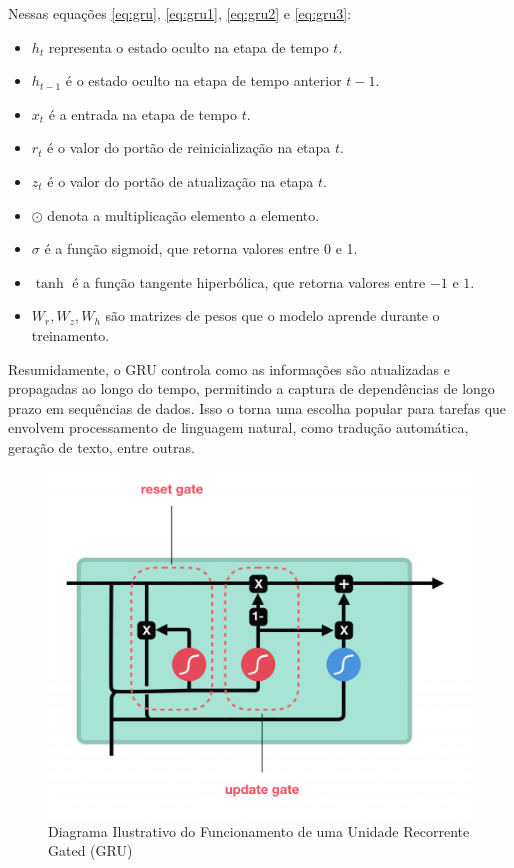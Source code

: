 Nessas equações \eqref{eq:gru}, \eqref{eq:gru1}, \eqref{eq:gru2} e \eqref{eq:gru3}:

\begin{itemize}
	\item \( h_t \) representa o estado oculto na etapa de tempo \( t \).

	\item \( h_{t-1} \) é o estado oculto na etapa de tempo anterior \( t-1 \).

	\item \( x_t \) é a entrada na etapa de tempo \( t \).

	\item \( r_t \) é o valor do portão de reinicialização na etapa \( t \).

	\item \( z_t \) é o valor do portão de atualização na etapa \( t \).

	\item \( \odot \) denota a multiplicação elemento a elemento.

	\item \( \sigma \) é a função sigmoid, que retorna valores entre 0 e 1.

	\item \( \tanh \) é a função tangente hiperbólica, que retorna valores entre $-1$ e $1$.

	\item \( W_r, W_z, W_h \) são matrizes de pesos que o modelo aprende durante o treinamento.
\end{itemize}

Resumidamente, o GRU controla como as informações são atualizadas e propagadas ao longo do tempo, permitindo a captura de dependências de longo prazo em sequências de dados. Isso o torna uma escolha popular para tarefas que envolvem processamento de linguagem natural, como tradução automática, geração de texto, entre outras.

\begin{figure}[!htpb]
	\centering
	\caption{Diagrama Ilustrativo do Funcionamento de uma Unidade Recorrente Gated (GRU)}
	\label{fig:gru4-1024x835}
	\includegraphics[width=0.7\linewidth]{Apendices/Figuras/modelagem-24h/gru4-1024x835}
	
\end{figure}



